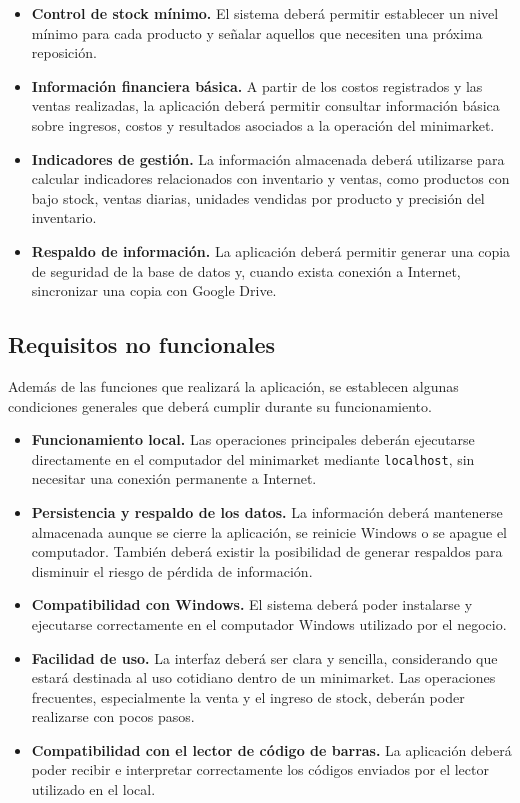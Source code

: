 \documentclass[10pt,a4paper]{article}
\begin{document}
\begin{itemize}[leftmargin=*]
\item \textbf{Control de stock mínimo.}  
El sistema deberá permitir establecer un nivel mínimo para cada producto y señalar aquellos que necesiten una próxima reposición.

\item \textbf{Información financiera básica.}  
A partir de los costos registrados y las ventas realizadas, la aplicación deberá permitir consultar información básica sobre ingresos, costos y resultados asociados a la operación del minimarket.

\item \textbf{Indicadores de gestión.}  
La información almacenada deberá utilizarse para calcular indicadores relacionados con inventario y ventas, como productos con bajo stock, ventas diarias, unidades vendidas por producto y precisión del inventario. 


\item \textbf{Respaldo de información.}  
La aplicación deberá permitir generar una copia de seguridad de la base de datos y, cuando exista conexión a Internet, sincronizar una copia con Google Drive.
\end{itemize}

\subsection{Requisitos no funcionales}

Además de las funciones que realizará la aplicación, se establecen algunas condiciones generales que deberá cumplir durante su funcionamiento.
\begin{itemize}[leftmargin=*]
    \item \textbf{Funcionamiento local.}  
    Las operaciones principales deberán ejecutarse directamente en el computador del minimarket mediante \texttt{localhost}, sin necesitar una conexión permanente a Internet.
    
    \item \textbf{Persistencia y respaldo de los datos.}  
    La información deberá mantenerse almacenada aunque se cierre la aplicación, se reinicie Windows o se apague el computador. También deberá existir la posibilidad de generar respaldos para disminuir el riesgo de pérdida de información.
    
    \item \textbf{Compatibilidad con Windows.}  
    El sistema deberá poder instalarse y ejecutarse correctamente en el computador Windows utilizado por el negocio.
    
    \item \textbf{Facilidad de uso.}  
    La interfaz deberá ser clara y sencilla, considerando que estará destinada al uso cotidiano dentro de un minimarket. Las operaciones frecuentes, especialmente la venta y el ingreso de stock, deberán poder realizarse con pocos pasos.
    
    \item \textbf{Compatibilidad con el lector de código de barras.}  
    La aplicación deberá poder recibir e interpretar correctamente los códigos enviados por el lector utilizado en el local.
\end{itemize}
\end{document}
